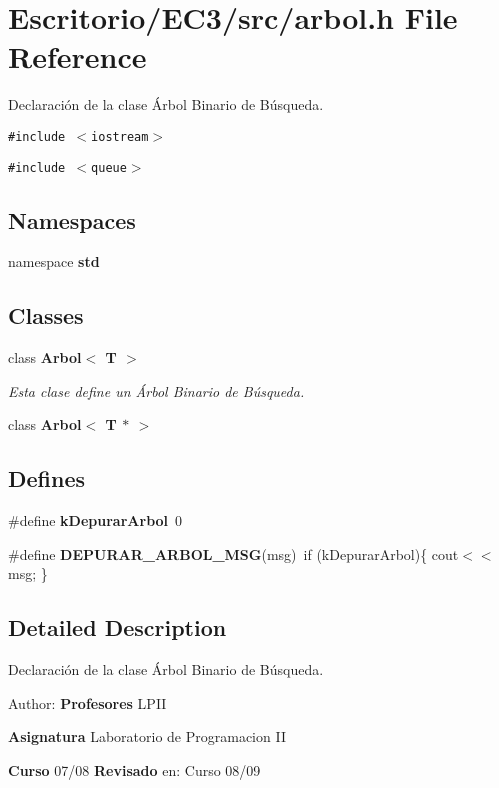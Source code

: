 \section{Escritorio/EC3/src/arbol.h File Reference}
\label{arbol_8h}
Declaración de la clase Árbol Binario de Búsqueda. 

{\tt \#include $<$iostream$>$}\par
{\tt \#include $<$queue$>$}\par
\subsection*{Namespaces}
\begin{CompactItemize}
\item 
namespace {\bf std}
\end{CompactItemize}
\subsection*{Classes}
\begin{CompactItemize}
\item 
class {\bf Arbol$<$ T $>$}
\begin{CompactList}\small\item\em Esta clase define un Árbol Binario de Búsqueda. \item\end{CompactList}\item 
class {\bf Arbol$<$ T $\ast$ $>$}
\end{CompactItemize}
\subsection*{Defines}
\begin{CompactItemize}
\item 
\#define {\bf kDepurarArbol}~0
\item 
\#define {\bf DEPURAR\_\-ARBOL\_\-MSG}(msg)~if (kDepurarArbol)\{ cout$<$$<$msg; \}
\end{CompactItemize}


\subsection{Detailed Description}
Declaración de la clase Árbol Binario de Búsqueda. 

\begin{Desc}
\item[Author:]{\bf Profesores} LPII \par
 {\bf Asignatura} Laboratorio de Programacion II \par
 {\bf Curso} 07/08 {\bf Revisado} en: Curso 08/09 \end{Desc}


